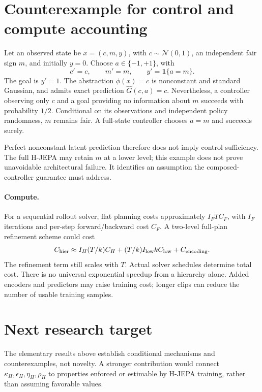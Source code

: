 \documentclass[11pt]{article}
\begin{document}
\section{Counterexample for control and compute accounting}
Let an observed state be $x=(c,m,y)$, with $c\sim\mathcal N(0,1)$, an independent fair sign $m$, and initially $y=0$. Choose $a\in\{-1,+1\}$, with
\[
 c'=c,\qquad m'=m,\qquad y'=\mathbf1\{a=m\}.
\]
The goal is $y'=1$. The abstraction $\phi(x)=c$ is nonconstant and standard Gaussian, and admits exact prediction $\widehat G(c,a)=c$. Nevertheless, a controller observing only $c$ and a goal providing no information about $m$ succeeds with probability $1/2$. Conditional on its observations and independent policy randomness, $m$ remains fair. A full-state controller chooses $a=m$ and succeeds surely.

Perfect nonconstant latent prediction therefore does not imply control sufficiency. The full H-JEPA may retain $m$ at a lower level; this example does not prove unavoidable architectural failure. It identifies an assumption the composed-controller guarantee must address.

\paragraph{Compute.}
For a sequential rollout solver, flat planning costs approximately $I_FTC_F$, with $I_F$ iterations and per-step forward/backward cost $C_F$. A two-level full-plan refinement scheme could cost
\[
 C_{\rm hier}\approx I_H(T/k)C_H+
 (T/k)I_{\rm low}kC_{\rm low}+C_{\rm encoding}.
\]
The refinement term still scales with $T$. Actual solver schedules determine total cost. There is no universal exponential speedup from a hierarchy alone. Added encoders and predictors may raise training cost; longer clips can reduce the number of usable training samples.

\section{Next research target}
The elementary results above establish conditional mechanisms and counterexamples, not novelty. A stronger contribution would connect $\kappa_H,\epsilon_H,\eta_H,\rho_H$ to properties enforced or estimable by H-JEPA training, rather than assuming favorable values.
\end{document}
